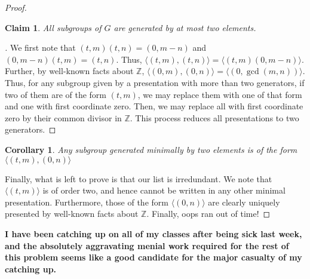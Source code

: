 \documentclass[english]{article}
\newcommand{\ZZ}{\mathbb{Z}}
\newenvironment{subproof}[1][\proofname]{%
	\renewcommand{\qedsymbol}{$\blacksquare$}%
	\begin{proof}[#1]%
	}{%
	\end{proof}%
}
\newtheorem*{corollary*}{Corollary}
\newtheorem*{claim*}{Claim}
\theoremstyle{remark}
\theoremstyle{definition}
\begin{document}
\begin{proof}
	\begin{claim*}
		All subgroups of $G$ are generated by at most two elements.
	\end{claim*}
\begin{subproof}
	We first note that $(t,m)(t,n)=(0,m-n)$ and $(0,m-n)(t,m)=(t,n)$. Thus, $\langle (t,m), (t,n) \rangle=\langle(t,m) (0,m-n)\rangle$. Further, by well-known facts about $\ZZ$, $\langle (0,m),(0,n) \rangle=\langle (0,\gcd (m,n))\rangle$. Thus, for any subgroup given by a presentation with more than two generators, if two of them are of the form $(t,m)$, we may replace them with one of that form and one with first coordinate zero. Then, we may replace all with first coordinate zero by their common divisor in $\ZZ$. This process reduces all presentations to two generators.
\end{subproof}
\begin{corollary*}
Any subgroup generated minimally by two elements is of the form $\langle (t,m), (0,n)\rangle$
\end{corollary*}
Finally, what is left to prove is that our list is irredundant. We note that $\langle (t,m)\rangle $ is of order two, and hence cannot be written in any other minimal presentation. Furthermore, those of the form $\langle(0,n)\rangle$ are clearly uniquely presented by well-known facts about $\ZZ$. Finally, \textellipsis oops ran out of time!
\end{proof}
\textbf{I have been catching up on all of my classes after being sick last week, and the absolutely aggravating menial work required for the rest of this problem seems like a good candidate for the major casualty of my catching up.}
\end{document}
